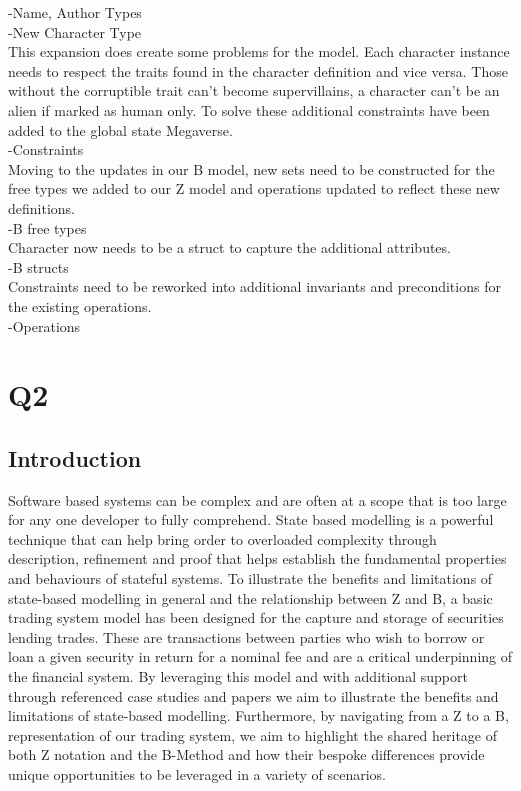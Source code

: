 \documentclass{article}
\begin{document}
-Name, Author Types \\
-New Character Type \\
This expansion does create some problems for the model. Each character instance needs to respect the traits found in the character definition and vice versa. Those without the corruptible trait can’t become supervillains, a character can’t be an alien if marked as human only. To solve these additional constraints have been added to the global state Megaverse.  \\
-Constraints \\
Moving to the updates in our B model, new sets need to be constructed for the free types we added to our Z model and operations updated to reflect these new definitions.  \\
-B free types \\
Character now needs to be a struct to capture the additional attributes. \\
-B structs \\
Constraints need to be reworked into additional invariants and preconditions for the existing operations. \\
-Operations \\


\pagebreak

\section*{Q2}

\subsection*{Introduction}

Software based systems can be complex and are often at a scope that is too large for any one developer to fully comprehend. State based modelling is a powerful technique that can help bring order to overloaded complexity through description, refinement and proof that helps establish the fundamental properties and behaviours of stateful systems.
\newline \newline
To illustrate the benefits and limitations of state-based modelling in general and the relationship between Z and B, a basic trading system model has been designed for the capture and storage of securities lending trades. These are transactions between parties who wish to borrow or loan a given security in return for a nominal fee and are a critical underpinning of the financial system.
\newline \newline
By leveraging this model and with additional support through referenced case studies and papers we aim to illustrate the benefits and limitations of state-based modelling. Furthermore, by navigating from a Z to a B, representation of our trading system, we aim to highlight the shared heritage of both Z notation and the B-Method and how their bespoke differences provide unique opportunities to be leveraged in a variety of scenarios.
\end{document}
